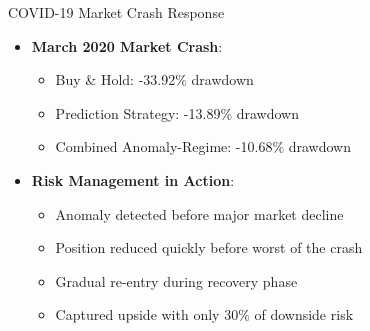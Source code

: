 \documentclass[aspectratio=169,xcolor=dvipsnames]{beamer}
\begin{document}
\begin{frame}{COVID-19 Market Crash Response}
	\begin{itemize}
		\item \textbf{March 2020 Market Crash}:
		      \begin{itemize}
			      \item Buy \& Hold: -33.92\% drawdown
			      \item Prediction Strategy: -13.89\% drawdown
			      \item Combined Anomaly-Regime: -10.68\% drawdown
		      \end{itemize}
		\item \textbf{Risk Management in Action}:
		      \begin{itemize}
			      \item Anomaly detected before major market decline
			      \item Position reduced quickly before worst of the crash
			      \item Gradual re-entry during recovery phase
			      \item Captured upside with only 30\% of downside risk
		      \end{itemize}
	\end{itemize}
\end{frame}
\end{document}

